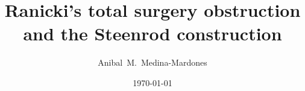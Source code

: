\documentclass{amsart}
\title{Ranicki's total surgery obstruction and the Steenrod construction}
\author[A.~Medina-Mardones]{Anibal~M.~Medina-Mardones}
\date{\today}
\begin{document}
	
	\maketitle
	
	
	
	
	
	
	
	\appendix
	
	\sloppy
	\printbibliography
\end{document}
